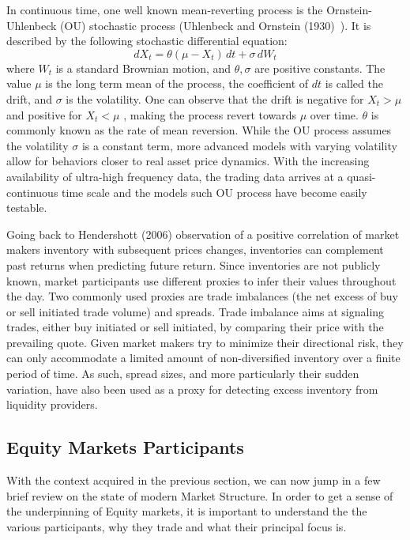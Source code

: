 In continuous time, one well known mean-reverting process is the Ornstein-Uhlenbeck (OU) stochastic process (Uhlenbeck and Ornstein (1930)~\cite{uhlenbeck}). It is described by the following stochastic differential equation:
	\begin{equation}\label{eqn:dxttheta}
	 dX_t = \theta(\mu - X_t)\,dt + \sigma \, dW_t 
	\end{equation}
where $W_t$ is a standard Brownian motion, and $\theta, \sigma$ are positive constants. The value $\mu$ is the long term mean of the process, the coefficient of $dt$ is called the drift, and $\sigma$ is the volatility. One can observe that the drift is negative for $X_t > \mu$ and positive for $X_t < \mu$ , making the process revert towards $\mu$ over time. $\theta$ is commonly known as the rate of mean reversion. While the OU process assumes the volatility $\sigma$ is a constant term, more advanced models with varying volatility allow for behaviors closer to real asset price dynamics. With the increasing availability of ultra-high frequency data, the trading data arrives at a quasi-continuous time scale and the models such OU process have become easily testable.


Going back to Hendershott (2006) observation of a positive correlation of market makers inventory with subsequent prices changes, inventories can complement past returns when predicting future return. Since inventories are not publicly known, market participants use different proxies to infer their values throughout the day. Two commonly used proxies are trade imbalances (the net excess of buy or sell initiated trade volume) and spreads. Trade imbalance aims at signaling trades, either buy initiated or sell initiated, by comparing their price with the prevailing quote. Given market makers try to minimize their directional risk, they can only accommodate a limited amount of non-diversified inventory over a finite period of time. As such, spread sizes, and more particularly their sudden variation, have also been used as a proxy for detecting excess inventory from liquidity providers.


\subsection{Equity Markets Participants} 
With the context acquired in the previous section, we can now jump in a few brief review on the state of modern Market Structure. In order to get a sense of the underpinning of Equity markets, it is important to understand the the various participants, why they trade and what their principal focus is. \\


